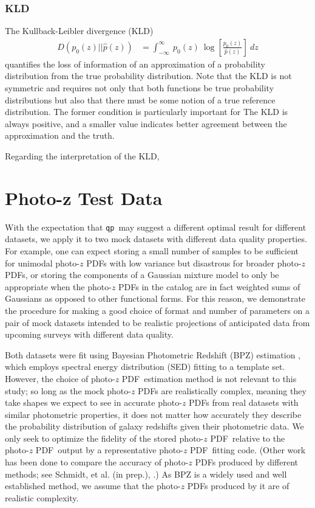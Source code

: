 \documentclass[\docopts]{\docclass}
\newcommand{\qp}{\texttt{qp}}
\newcommand{\pz}{photo-$z$ PDF}
\begin{document}
\subsubsection{KLD}
\label{sec:kld}

The Kullback-Leibler divergence (KLD)
\begin{align}
  \label{eq:kld}
  D(p_{0}(z) || \hat{p}(z)) &= \int_{-\infty}^{\infty}\ p_{0}(z)\ 
\log\left[\frac{p_{0}(z)}{\hat{p}(z)}\right]\ dz
\end{align}
quantifies the loss of information of an approximation of a probability 
distribution from the true probability distribution.  Note that the KLD is not 
symmetric and requires not only that both functions be true probability 
distributions but also that there must be some notion of a true reference 
distribution.  The former condition is particularly important for The KLD is 
always positive, and a smaller value indicates better agreement between the 
approximation and the truth.

Regarding the interpretation of the KLD,


\section{Photo-z Test Data}
\label{sec:data}

With the expectation that \qp\  may suggest a different optimal result for 
different datasets, we apply it to two mock datasets with different data 
quality properties.  For example, one can expect storing a small number of 
samples to be sufficient for unimodal \pz s with low variance but disastrous 
for broader \pz s, or storing the components of a Gaussian mixture model to 
only be appropriate when the \pz s in the catalog are in fact weighted sums of 
Gaussians as opposed to other functional forms.  For this reason, we 
demonstrate the procedure for making a good choice of format and number of 
parameters on a pair of mock datasets intended to be realistic projections of 
anticipated data from upcoming surveys with different data quality.

Both datasets were fit using Bayesian Photometric Redshift (BPZ) estimation 
\citep{benitez_bayesian_2000}, which employs spectral energy distribution (SED) 
fitting to a template set.  However, the choice of \pz\ estimation method is 
not relevant to this study; so long as the mock \pz s are realistically 
complex, meaning they take shapes we expect to see in accurate \pz s from real 
datasets with similar photometric properties, it does not matter how accurately 
they describe the probability distribution of galaxy redshifts given their 
photometric data.  We only seek to optimize the fidelity of the stored \pz\ 
relative to the \pz\ output by a representative \pz\ fitting code.  (Other work 
has been done to compare the accuracy of \pz s produced by different methods; 
see Schmidt, et al. (in prep.), \citet{tanaka_photometric_2017}.)  As BPZ is a 
widely used and well established method, we assume that the \pz s produced by 
it are of realistic complexity.
\end{document}
